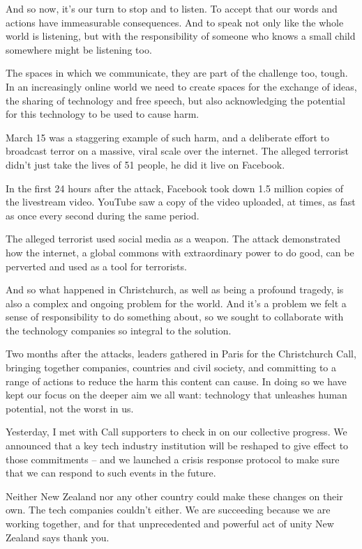 \documentclass[10pt,a4paper]{article}
\begin{document}
And so now, it’s our turn to stop and to listen. To accept that our words and actions have immeasurable consequences. And to speak not only like the whole world is listening, but with the responsibility of someone who knows a small child somewhere might be listening too.

The spaces in which we communicate, they are part of the challenge too, tough. In an increasingly online world we need to create spaces for the exchange of ideas, the sharing of technology and free speech, but also acknowledging the potential for this technology to be used to cause harm.

March 15 was a staggering example of such harm, and a deliberate effort to broadcast terror on a massive, viral scale over the internet. The alleged terrorist didn’t just take the lives of 51 people, he did it live on Facebook.

In the first 24 hours after the attack, Facebook took down 1.5 million copies of the livestream video. YouTube saw a copy of the video uploaded, at times, as fast as once every second during the same period.

The alleged terrorist used social media as a weapon. The attack demonstrated how the internet, a global commons with extraordinary power to do good, can be perverted and used as a tool for terrorists.

And so what happened in Christchurch, as well as being a profound tragedy, is also a complex and ongoing problem for the world. And it’s a problem we felt a sense of responsibility to do something about, so we sought to collaborate with the technology companies so integral to the solution.

Two months after the attacks, leaders gathered in Paris for the Christchurch Call, bringing together companies, countries and civil society, and committing to a range of actions to reduce the harm this content can cause. In doing so we have kept our focus on the deeper aim we all want: technology that unleashes human potential, not the worst in us.

Yesterday, I met with Call supporters to check in on our collective progress. We announced that a key tech industry institution will be reshaped to give effect to those commitments – and we launched a crisis response protocol to make sure that we can respond to such events in the future.

Neither New Zealand nor any other country could make these changes on their own. The tech companies couldn’t either. We are succeeding because we are working together, and for that unprecedented and powerful act of unity New Zealand says thank you.
\end{document}
